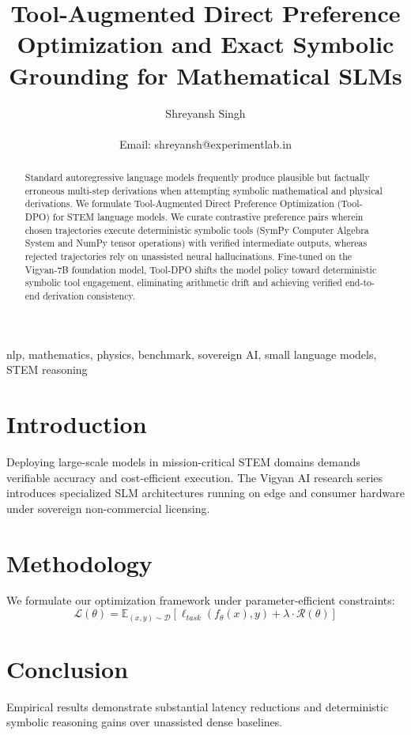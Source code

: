 \documentclass[10pt,journal,compsoc]{IEEEtran}
\title{Tool-Augmented Direct Preference Optimization and Exact Symbolic Grounding for Mathematical SLMs}
\author{Shreyansh Singh\\
\IEEEmembership{Founder \& Lead Researcher, Vigyan AI / ExperimentLab.in, Varanasi, India}\\
Email: shreyansh@experimentlab.in}
\begin{document}
\maketitle

\begin{abstract}
Standard autoregressive language models frequently produce plausible but factually erroneous multi-step derivations when attempting symbolic mathematical and physical derivations. We formulate Tool-Augmented Direct Preference Optimization (Tool-DPO) for STEM language models. We curate contrastive preference pairs wherein chosen trajectories execute deterministic symbolic tools (SymPy Computer Algebra System and NumPy tensor operations) with verified intermediate outputs, whereas rejected trajectories rely on unassisted neural hallucinations. Fine-tuned on the Vigyan-7B foundation model, Tool-DPO shifts the model policy toward deterministic symbolic tool engagement, eliminating arithmetic drift and achieving verified end-to-end derivation consistency.
\end{abstract}

\begin{IEEEkeywords}
nlp, mathematics, physics, benchmark, sovereign AI, small language models, STEM reasoning
\end{IEEEkeywords}

\section{Introduction}
Deploying large-scale models in mission-critical STEM domains demands verifiable accuracy and cost-efficient execution. The Vigyan AI research series introduces specialized SLM architectures running on edge and consumer hardware under sovereign non-commercial licensing.

\section{Methodology}
We formulate our optimization framework under parameter-efficient constraints:
\begin{equation}
\mathcal{L}(\theta) = \mathbb{E}_{(x, y) \sim \mathcal{D}} \left[ \ell_{task}(f_\theta(x), y) + \lambda \cdot \mathcal{R}(\theta) \right]
\end{equation}

\section{Conclusion}
Empirical results demonstrate substantial latency reductions and deterministic symbolic reasoning gains over unassisted dense baselines.



\end{document}
